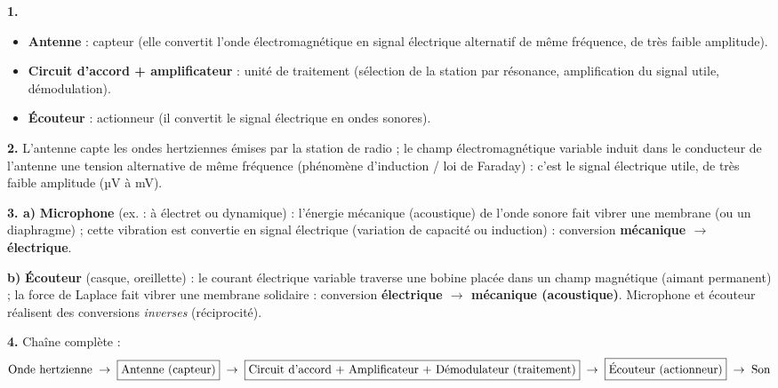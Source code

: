 \documentclass[11pt]{article}
\newcommand{\cle}[1]{{\popxbold\color{popdark}#1}}
\newcounter{popsec}
\newcounter{popsub}
\newcommand{\courssub}[1]{%
  \stepcounter{popsub}%
  \par\vspace{9pt}\noindent{\popxbold\fontsize{11.5}{13}\selectfont\color{popink}{\color{poporange}\thepopsec.\thepopsub}\hspace{6pt}#1}\par\nopagebreak\vspace{4pt}
}
\begin{document}
\begin{corrige}
\textbf{1.} 
\begin{itemize}
\item \textbf{Antenne} : \cle{capteur} (elle convertit l'onde électromagnétique en signal électrique alternatif de même fréquence, de très faible amplitude).
\item \textbf{Circuit d'accord + amplificateur} : \cle{unité de traitement} (sélection de la station par résonance, amplification du signal utile, démodulation).
\item \textbf{Écouteur} : \cle{actionneur} (il convertit le signal électrique en ondes sonores).
\end{itemize}

\textbf{2.} L'antenne capte les ondes hertziennes émises par la station de radio ; le champ électromagnétique variable induit dans le conducteur de l'antenne une tension alternative de même fréquence (phénomène d'induction / loi de Faraday) : c'est le signal électrique utile, de très faible amplitude (µV à mV).

\textbf{3. a)} \textbf{Microphone} (ex. : à électret ou dynamique) : l'énergie mécanique (acoustique) de l'onde sonore fait vibrer une membrane (ou un diaphragme) ; cette vibration est convertie en signal électrique (variation de capacité ou induction) : conversion \textbf{mécanique $\rightarrow$ électrique}.

\textbf{b)} \textbf{Écouteur} (casque, oreillette) : le courant électrique variable traverse une bobine placée dans un champ magnétique (aimant permanent) ; la force de Laplace fait vibrer une membrane solidaire : conversion \textbf{électrique $\rightarrow$ mécanique (acoustique)}. Microphone et écouteur réalisent des conversions \emph{inverses} (réciprocité).

\textbf{4.} Chaîne complète :
\[
\text{Onde hertzienne} \;\rightarrow\; \fbox{Antenne (capteur)} \;\rightarrow\; \fbox{Circuit d'accord + Amplificateur + Démodulateur (traitement)} \;\rightarrow\; \fbox{Écouteur (actionneur)} \;\rightarrow\; \text{Son}
\]
\end{corrige}

\courssub{Je me prépare au Bac}
\end{document}
